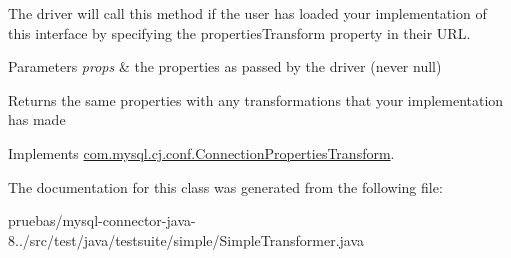 The driver will call this method if the user has loaded your implementation of this interface by specifying the \textquotesingle{}properties\+Transform\textquotesingle{} property in their U\+RL.


\begin{DoxyParams}{Parameters}
{\em props} & the properties as passed by the driver (never null)\\
\hline
\end{DoxyParams}
\begin{DoxyReturn}{Returns}
the same properties with any transformations that your implementation has made 
\end{DoxyReturn}


Implements \mbox{\hyperlink{interfacecom_1_1mysql_1_1cj_1_1conf_1_1_connection_properties_transform_ab1b0ebd09935c348ec99fb122e1a220b}{com.\+mysql.\+cj.\+conf.\+Connection\+Properties\+Transform}}.



The documentation for this class was generated from the following file\+:\begin{DoxyCompactItemize}
\item 
pruebas/mysql-\/connector-\/java-\/8../src/test/java/testsuite/simple/Simple\+Transformer.\+java\end{DoxyCompactItemize}
